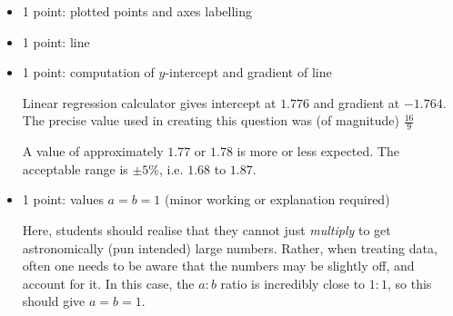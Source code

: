 \documentclass[a4paper,11pt]{exam}
\begin{document}
\begin{questions}
\begin{solution}
\begin{itemize}
			\item 1 point: plotted points and axes labelling
			\item 1 point: line
			\item 1 point: computation of $y$-intercept and gradient of line
			
			Linear regression calculator gives intercept at $1.776$ and gradient at $-1.764$. The precise value used in creating this question was (of magnitude) $\frac{16}{9} $%
			
			A value of approximately $1.77$ or $1.78$ is more or less expected. The acceptable range is $\pm 5\%$, i.e. $1.68$ to $1.87$.
			
			\begin{figure}[H]
				\centering
			\end{figure}
			
			\item 1 point: values $a=b=1$ (minor working or explanation required)
			
			Here, students should realise that they cannot just \textit{multiply} to get astronomically (pun intended) large numbers. Rather, when treating data, often one needs to be aware that the numbers may be slightly off, and account for it. In this case, the $a:b$ ratio is incredibly close to $1:1$, so this should give $a=b=1$.
		\end{itemize}
	\end{solution}

\end{questions}
\end{document}
